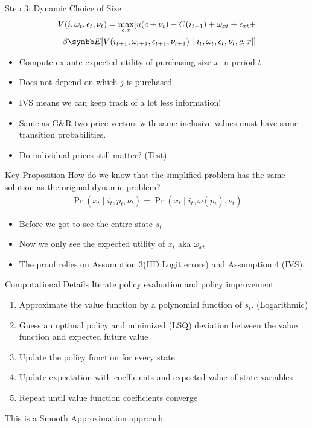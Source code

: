 \documentclass[aspectratio=169,11pt]{beamer}
\begin{document}
\begin{frame}{Step 3: Dynamic Choice of Size}
\begin{align*}
V(i,\omega_t,\epsilon_t,\nu_t) = \max_{c,x} [ u(c + \nu_t) - C(i_{t+1}) + \omega_{xt} + \epsilon_{xt} + \\
\beta \E[V(i_{t+1},\omega_{t+1},\epsilon_{t+1},\nu_{t+1}) \mid i_t, \omega_t, \epsilon_t, \nu_t, c, x] ]
\end{align*}

\begin{itemize}
\item Compute ex-ante expected utility of purchasing size $x$ in period $t$
\item Does not depend on which $j$ is purchased.
\item IVS means we can keep track of a lot less information!
\item Same as G\&R two price vectors with same inclusive values must have same transition probabilities.
\item Do individual prices still matter? (Test)
\end{itemize}
\end{frame}

\begin{frame}{Key Proposition}
How do we know that the simplified problem has the same solution as the original dynamic problem?
\begin{align*}
\Pr(x_t \mid i_t,p_t, \nu_t) = \Pr(x_t \mid i_t, \omega(p_t),\nu_t)
\end{align*}

\begin{itemize}
\item Before we got to see the entire state $s_t$
\item Now we only see the expected utility of $x_t$ aka $\omega_{xt}$
\item The proof relies on Assumption 3(IID Logit errors) and Assumption 4 (IVS).
\end{itemize}
\end{frame}

\begin{frame}{Computational Details}
Iterate policy evaluation and policy improvement 
\begin{enumerate}
\item Approximate the value function by a polynomial function of $s_t$. (Logarithmic)
\item Guess an optimal policy and minimized (LSQ) deviation between the value function and expected future value
\item Update the policy function for every state
\item Update expectation with coefficients and expected value of state variables
\item Repeat until value function coefficients converge
\end{enumerate}
This is a \alert{Smooth Approximation} approach
\end{frame}
\end{document}
